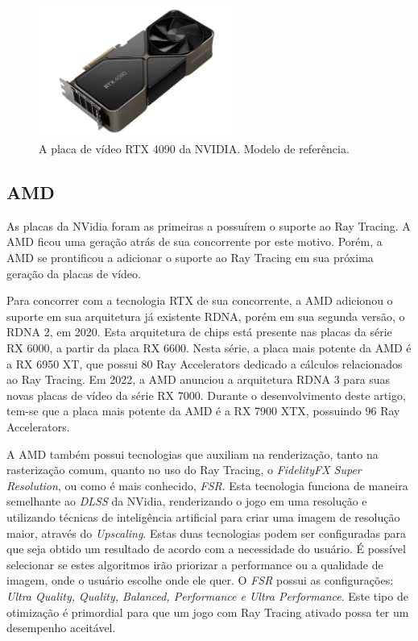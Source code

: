\documentclass[journal]{IEEEtran}
\begin{document}
\begin{figure}[ht]
  \centering
  \includegraphics[width=2.5in]{media/rtx4090.jpg}
  \caption{A placa de vídeo RTX 4090 da NVIDIA. Modelo de referência.}
  \label{img_rtx4090}
\end{figure}


\subsection{AMD}
As placas da NVidia foram as primeiras a possuírem o suporte ao Ray Tracing. A AMD
ficou uma geração atrás de sua concorrente por este motivo. Porém, a AMD se prontificou
a adicionar o suporte ao Ray Tracing em sua próxima geração da placas de vídeo.

Para concorrer com a tecnologia RTX de sua concorrente, a AMD adicionou o suporte em sua
arquitetura já existente RDNA, porém em sua segunda versão, o RDNA 2, em 2020. Esta arquitetura 
de chips está presente nas placas da série RX 6000, a partir da placa RX 6600. Nesta série,
a placa mais potente da AMD é a RX 6950 XT, que possui 80 Ray Accelerators dedicado a
cálculos relacionados ao Ray Tracing. Em 2022, a AMD anunciou a arquitetura RDNA 3 para
suas novas placas de vídeo da série RX 7000. Durante o desenvolvimento deste artigo,
tem-se que a placa mais potente da AMD é a RX 7900 XTX, possuindo 96 Ray Accelerators.

A AMD também possui tecnologias que auxiliam na renderização, tanto na rasterização comum,
quanto no uso do Ray Tracing, o \emph{FidelityFX Super Resolution}, ou como é mais conhecido,
\emph{FSR}. Esta tecnologia funciona de maneira semelhante ao \emph{DLSS} da NVidia, renderizando
o jogo em uma resolução e utilizando técnicas de inteligência artificial para criar uma imagem
de resolução maior, através do \emph{Upscaling}. Estas duas tecnologias podem ser configuradas
para que seja obtido um
resultado de acordo com a necessidade do usuário. É possível selecionar se estes algoritmos
irão priorizar a performance ou a qualidade de imagem, onde o usuário escolhe onde ele quer.
O \emph{FSR} possui as configurações: \emph{Ultra Quality, Quality, Balanced, Performance e
Ultra Performance}. Este tipo de otimização é primordial para que um jogo com Ray Tracing
ativado possa ter um desempenho aceitável.
\end{document}
